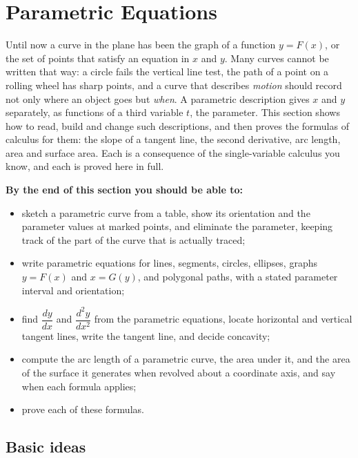 \documentclass[11pt]{article}
\begin{document}
\section{Parametric Equations}

\begin{guide}
Until now a curve in the plane has been the graph of a function $y=F(x)$, or the set of points that satisfy an equation in $x$ and $y$. Many curves cannot be written that way: a circle fails the vertical line test, the path of a point on a rolling wheel has sharp points, and a curve that describes \emph{motion} should record not only where an object goes but \emph{when}. A parametric description gives $x$ and $y$ separately, as functions of a third variable $t$, the parameter. This section shows how to read, build and change such descriptions, and then proves the formulas of calculus for them: the slope of a tangent line, the second derivative, arc length, area and surface area. Each is a consequence of the single-variable calculus you know, and each is proved here in full.
\end{guide}

\textbf{By the end of this section you should be able to:}
\begin{itemize}
  \item sketch a parametric curve from a table, show its orientation and the parameter values at marked points, and eliminate the parameter, keeping track of the part of the curve that is actually traced;
  \item write parametric equations for lines, segments, circles, ellipses, graphs $y=F(x)$ and $x=G(y)$, and polygonal paths, with a stated parameter interval and orientation;
  \item find $\dfrac{dy}{dx}$ and $\dfrac{d^2y}{dx^2}$ from the parametric equations, locate horizontal and vertical tangent lines, write the tangent line, and decide concavity;
  \item compute the arc length of a parametric curve, the area under it, and the area of the surface it generates when revolved about a coordinate axis, and say when each formula applies;
  \item prove each of these formulas.
\end{itemize}

\subsection*{Basic ideas}
\end{document}
